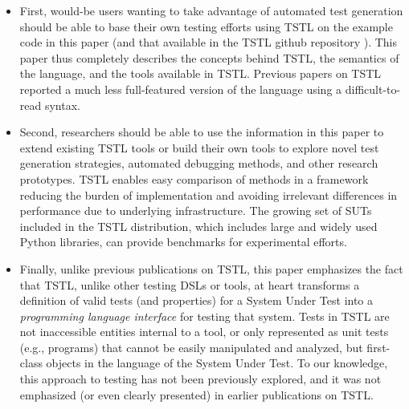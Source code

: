 \begin{itemize}
\item First, would-be users wanting to take advantage of automated
  test generation should be able to base their own testing
  efforts using TSTL on the example code in this paper (and that available
  in the TSTL github repository \cite{tstl}).
  This paper thus completely describes the concepts behind TSTL, the
  semantics of the language, and the tools available in TSTL.
  Previous papers on TSTL \cite{NFM15,ISSTA15} reported a much less full-featured version of the
  language using a difficult-to-read syntax.

\item Second, researchers should be able to use the information in this paper to
  extend existing TSTL tools or build their own tools to explore novel
  test generation strategies, automated debugging methods, and other
  research prototypes.  TSTL enables easy comparison of
  methods in a framework reducing the burden of implementation
  and avoiding irrelevant differences in performance due to underlying
  infrastructure.  The growing set of SUTs
  included in the TSTL distribution, which includes large and widely
  used Python libraries, can provide benchmarks for
  experimental efforts.  

\item Finally, unlike previous publications on TSTL, this paper
  emphasizes the fact that TSTL, unlike other testing DSLs or tools,
  at heart transforms a definition of valid tests (and properties) for
  a System Under Test into a \emph{programming language interface} for testing
  that system.  Tests in TSTL are not inaccessible entities internal to
  a tool,
  or only represented as unit tests (e.g., programs) that cannot be
  easily manipulated and analyzed, but first-class objects in the
  language of the System Under Test.  To our knowledge, this approach
  to testing has not been previously explored, and it was not
  emphasized (or even clearly presented) in earlier publications on TSTL.
\end{itemize}


